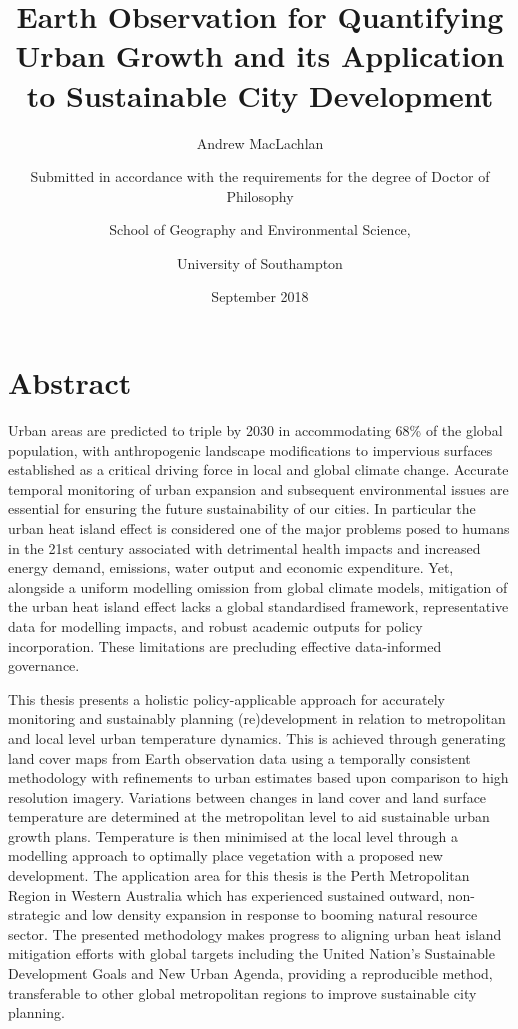 \documentclass[]{book}
\title{Earth Observation for Quantifying Urban Growth and its Application to
Sustainable City Development}
\subtitle{Andrew MacLachlan}
\author{Submitted in accordance with the requirements for the degree of Doctor
of Philosophy \and School of Geography and Environmental Science, \and University of Southampton}
\date{September 2018}
\begin{document}
\maketitle

{
\setcounter{tocdepth}{1}
\tableofcontents
}
\section*{Abstract}\label{abstract}

Urban areas are predicted to triple by 2030 in accommodating 68\% of the
global population, with anthropogenic landscape modifications to
impervious surfaces established as a critical driving force in local and
global climate change. Accurate temporal monitoring of urban expansion
and subsequent environmental issues are essential for ensuring the
future sustainability of our cities. In particular the urban heat island
effect is considered one of the major problems posed to humans in the
21st century associated with detrimental health impacts and increased
energy demand, emissions, water output and economic expenditure. Yet,
alongside a uniform modelling omission from global climate models,
mitigation of the urban heat island effect lacks a global standardised
framework, representative data for modelling impacts, and robust
academic outputs for policy incorporation. These limitations are
precluding effective data-informed governance.

This thesis presents a holistic policy-applicable approach for
accurately monitoring and sustainably planning (re)development in
relation to metropolitan and local level urban temperature dynamics.
This is achieved through generating land cover maps from Earth
observation data using a temporally consistent methodology with
refinements to urban estimates based upon comparison to high resolution
imagery. Variations between changes in land cover and land surface
temperature are determined at the metropolitan level to aid sustainable
urban growth plans. Temperature is then minimised at the local level
through a modelling approach to optimally place vegetation with a
proposed new development. The application area for this thesis is the
Perth Metropolitan Region in Western Australia which has experienced
sustained outward, non-strategic and low density expansion in response
to booming natural resource sector. The presented methodology makes
progress to aligning urban heat island mitigation efforts with global
targets including the United Nation's Sustainable Development Goals and
New Urban Agenda, providing a reproducible method, transferable to other
global metropolitan regions to improve sustainable city planning.
\end{document}
